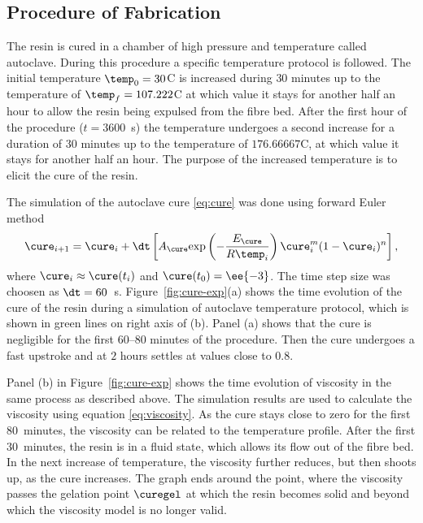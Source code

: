 \documentclass[twoside,a4paper,12pt]{article}
\newcommand{\figref}[1]{Figure~\ref{#1}}
\newcommand{\note}[1]{}
\begin{document}
\subsection{Procedure of Fabrication}

The resin is cured in a chamber of high pressure and temperature
called autoclave. During this procedure a specific temperature
protocol is followed.  The initial temperature $\temp_0 = 30$\degree C is
increased during $30$ minutes up to the temperature of
$\temp_f = 107.222$\degree C at which value it stays for another half an
hour to allow the resin being expulsed from the fibre bed. After the
first hour of the procedure ($t=3600$~s) the temperature undergoes a
second increase for a duration of $30$ minutes up to the temperature
of $176.66667$\degree C, at which value it stays for another half an
hour. \note{check the duration} The purpose of the increased
temperature is to elicit the cure of the resin.

The simulation of the autoclave cure \eqref{eq:cure} was done using
forward Euler method
%
\begin{align}
  \cure_{i+1} =    \cure_i + \dt \left[A_\cure \exp{-\frac{E_\cure }{R\temp_i}} \cure_i^m (1-\cure_i)^n\right], \label{eq:cure-fe}
\end{align}
%
where $\cure_i \approx \cure(t_i)$ and $\cure(t_0)=\ee{-3}$. The
time step size was choosen as $\dt = 60$~s.
%
\figref{fig:cure-exp}(a) shows the time evolution of the cure of the
resin during a simulation of autoclave temperature protocol, which is
shown in green lines on right axis of (b).  Panel (a) shows that the
cure is negligible for the first $60$--$80$ minutes of the
procedure. Then the cure undergoes a fast upstroke and at $2$ hours
settles at values close to $0.8$.
%
\note{the equation \eqref{eq:cure} might not be realistic for high values of cure}

Panel (b) in \figref{fig:cure-exp} shows the time evolution of
viscosity in the same process as described above. The simulation
results are used to calculate the viscosity using equation
\eqref{eq:viscosity}. As the cure stays close to zero for the first
$80$~minutes, the viscosity can be related to the temperature
profile. After the first $30$~minutes, the resin is in a fluid state,
which allows its flow out of the fibre bed. In the next increase of
temperature, the viscosity further reduces, but then shoots up, as the
cure increases. The graph ends around the point, where the viscosity
passes the gelation point $\curegel$ at which the resin becomes solid
and beyond which the viscosity model is no longer valid.
\end{document}

